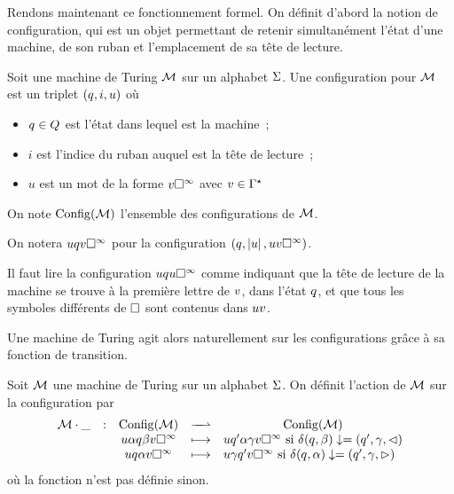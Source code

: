 Rendons maintenant ce fonctionnement formel. On définit d'abord la notion de
configuration, qui est un objet permettant de retenir simultanément l'état d'une
machine, de son ruban et l'emplacement de sa tête de lecture.

\begin{definition}
  Soit une machine de Turing $\mathcal{M}$ sur un alphabet $\Sigma$. Une configuration
  pour $\mathcal{M}$ est un triplet $(q_{},i,u)$ où
  \begin{itemize}
  \item $q_{} \in Q_{}$ est l'état dans lequel est la machine~;
  \item $i$ est l'indice du ruban auquel est la tête de lecture~;
  \item $u$ est un mot de la forme $v\square^{\infty}$ avec $v \in\Gamma^{\star}$
  \end{itemize}
  On note $\operatorname{Config}(\mathcal{M})$ l'ensemble des configurations de $\mathcal{M}$.
\end{definition}

\begin{notation}
  On notera $uq_{}v\square^{\infty}$ pour la configuration
  $(q_{},\left|u\right|,uv\square^{\infty})$.
\end{notation}

Il faut lire la configuration $uq_{}u\square^{\infty}$ comme indiquant que la
tête de lecture de la machine se trouve à la première lettre de $v$, dans
l'état $q_{}$, et que tous les symboles différents de $\square$ sont contenus dans
$uv$.

Une machine de Turing agit alors naturellement sur les configurations grâce à sa
fonction de transition.

\begin{definition}
  Soit $\mathcal{M}$ une machine de Turing sur un alphabet $\Sigma$. On définit
  l'action de $\mathcal{M}$ sur la configuration par
  \[
  \makeFunBisPartial{\varTMM\opTM\tok}{\Config(\varTMM)}{\Config(\varTMM)}
                    {\varwd\varla\varq\varlb\varwv\toInf}
                    {\varwd\varq'\varla\varlc\varwv\toInf\text{ si }
                      \trA(\varq,\varlb) \conveq (\varq',\varlc,\lTr)}
                    {\varwd\varq\varla\varwv\toInf}
                    {\varwd\varlc\varq'\varwv\toInf\text{ si }
                      \trA(\varq,\varla) \conveq (\varq',\varlc,\rTr)}
                    \]
  où la fonction n'est pas définie sinon.
\end{definition}

